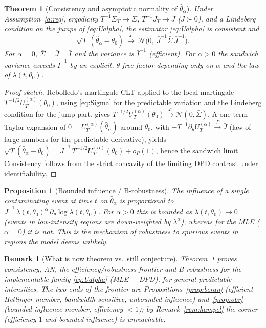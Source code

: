 \documentclass[11pt]{article}
\newtheorem{theorem}{Theorem}
\newtheorem{proposition}{Proposition}
\newtheorem{remark}{Remark}
\newcommand{\toP}{\xrightarrow{P}}
\newcommand{\toL}{\xrightarrow{\mathcal{L}}}
\begin{document}
\begin{theorem}[Consistency and asymptotic normality of $\hat\theta_\alpha$]
\label{thm:mest}
Under Assumption~\ref{a:reg}, ergodicity $T^{-1}\Sigma_T\to\bar\Sigma$,
$T^{-1}J_T\to\bar J$ ($\bar J\succ0$), and a Lindeberg condition on the jumps of
\eqref{eq:Ualpha}, the estimator \eqref{eq:Ualpha} is consistent and
\[
\sqrt T\,(\hat\theta_\alpha-\theta_0)\ \toL\ \mathcal N\!\big(0,\ \bar J^{-1}\bar\Sigma\,\bar J^{-1}\big).
\]
For $\alpha=0$, $\bar\Sigma=\bar J=\bar I$ and the variance is $\bar I^{-1}$
(efficient). For $\alpha>0$ the sandwich variance exceeds $\bar I^{-1}$ by an
explicit, $\theta$-free factor depending only on $\alpha$ and the law of
$\lambda(t,\theta_0)$.
\end{theorem}
\begin{proof}[Proof sketch]
Rebolledo's martingale CLT \citep{rebolledo1980,abgk1993} applied to the
local martingale $T^{-1/2}U_T^{(\alpha)}(\theta_0)$, using
\eqref{eq:Sigma} for the predictable variation and the Lindeberg condition for
the jump part, gives $T^{-1/2}U_T^{(\alpha)}(\theta_0)\toL\mathcal N(0,\bar\Sigma)$.
A one-term Taylor expansion of $0=U_T^{(\alpha)}(\hat\theta_\alpha)$ around
$\theta_0$, with $-T^{-1}\partial_\theta U_T^{(\alpha)}\toP\bar J$ (law of large
numbers for the predictable derivative), yields
$\sqrt T(\hat\theta_\alpha-\theta_0)=\bar J^{-1}\,T^{-1/2}U_T^{(\alpha)}(\theta_0)+o_P(1)$,
hence the sandwich limit. Consistency follows from the strict concavity of the
limiting DPD contrast under identifiability.
\end{proof}

\begin{proposition}[Bounded influence / B-robustness]\label{prop:if2}
The influence of a single contaminating event at time $t$ on
$\hat\theta_\alpha$ is proportional to
$\bar J^{-1}\,\lambda(t,\theta_0)^{\alpha}\,\partial_\theta\log\lambda(t,\theta_0)$.
For $\alpha>0$ this is \emph{bounded} as $\lambda(t,\theta_0)\to0$ (events in
low-intensity regions are down-weighted by $\lambda^{\alpha}$), whereas for the
MLE ($\alpha=0$) it is not. This is the mechanism of robustness to spurious
events in regions the model deems unlikely.
\end{proposition}

\begin{remark}[What is now theorem vs.\ still conjecture]
Theorem~\ref{thm:mest} \emph{proves} consistency, AN, the
efficiency/robustness frontier and B-robustness for the implementable family
\eqref{eq:Ualpha} (MLE $+$ DPD), for general predictable intensities. The two ends
of the frontier are Propositions~\ref{prop:beran} (efficient Hellinger member,
bandwidth-sensitive, unbounded influence) and~\ref{prop:obr} (bounded-influence
member, efficiency $<1$); by Remark~\ref{rem:hampel} the corner
(efficiency $1$ and bounded influence) is unreachable.
\end{remark}
\end{document}
